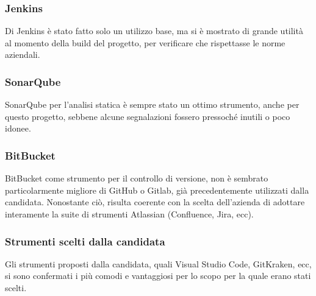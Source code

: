    \subsubsection{Jenkins}
    Di Jenkins è stato fatto solo un utilizzo base, ma si è mostrato di grande utilità al momento della build del progetto, per verificare che rispettasse le norme aziendali.

    \subsubsection{SonarQube}
    SonarQube per l'analisi statica è sempre stato un ottimo strumento, anche per questo progetto, sebbene alcune segnalazioni fossero pressoché inutili o poco idonee.

    \subsubsection{BitBucket}
    BitBucket come strumento per il controllo di versione, non è sembrato particolarmente migliore di GitHub o Gitlab, già precedentemente utilizzati dalla candidata.
    Nonostante ciò, risulta coerente con la scelta dell'azienda di adottare interamente la suite di strumenti Atlassian (Confluence, Jira, ecc).

    \subsubsection{Strumenti scelti dalla candidata}
    Gli strumenti proposti dalla candidata, quali Visual Studio Code, GitKraken, ecc, si sono confermati i più comodi e vantaggiosi per lo scopo per la quale erano stati scelti.




\clearpage

